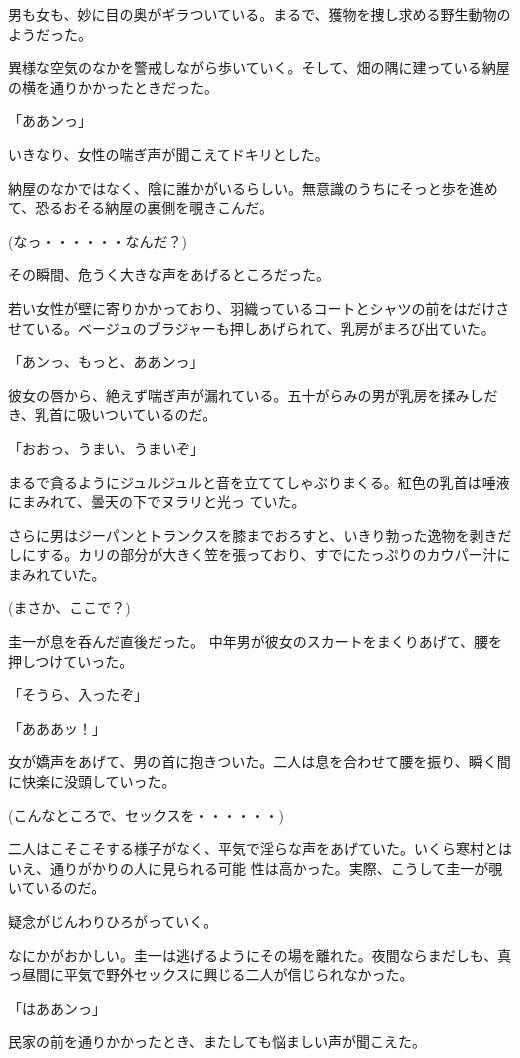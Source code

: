 ﻿\documentclass[book,tate]{jlreq}
\begin{document}
男も女も、妙に目の奥がギラついている。まるで、獲物を捜し求める野生動物のようだった。

異様な空気のなかを警戒しながら歩いていく。そして、畑の隅に建っている納屋の横を通りかかったときだった。

「ああンっ」

いきなり、女性の喘ぎ声が聞こえてドキリとした。

納屋のなかではなく、陰に誰かがいるらしい。無意識のうちにそっと歩を進めて、恐るおそる納屋の裏側を覗きこんだ。

(なっ・・・・・・なんだ？)

その瞬間、危うく大きな声をあげるところだった。

若い女性が壁に寄りかかっており、羽織っているコートとシャツの前をはだけさせている。ベージュのブラジャーも押しあげられて、乳房がまろび出ていた。

「あンっ、もっと、ああンっ」

彼女の唇から、絶えず喘ぎ声が漏れている。五十がらみの男が乳房を揉みしだき、乳首に吸いついているのだ。

「おおっ、うまい、うまいぞ」

まるで貪るようにジュルジュルと音を立ててしゃぶりまくる。紅色の乳首は唾液にまみれて、曇天の下でヌラリと光っ ていた。

さらに男はジーパンとトランクスを膝までおろすと、いきり勃った逸物を剥きだしにする。カリの部分が大きく笠を張っており、すでにたっぷりのカウパー汁にまみれていた。

(まさか、ここで？)

圭一が息を呑んだ直後だった。 中年男が彼女のスカートをまくりあげて、腰を押しつけていった。

「そうら、入ったぞ」

「あああッ！」

女が嬌声をあげて、男の首に抱きついた。二人は息を合わせて腰を振り、瞬く間に快楽に没頭していった。

(こんなところで、セックスを・・・・・・)

二人はこそこそする様子がなく、平気で淫らな声をあげていた。いくら寒村とはいえ、通りがかりの人に見られる可能 性は高かった。実際、こうして圭一が覗いているのだ。

疑念がじんわりひろがっていく。

なにかがおかしい。圭一は逃げるようにその場を離れた。夜間ならまだしも、真っ昼間に平気で野外セックスに興じる二人が信じられなかった。

「はああンっ」

民家の前を通りかかったとき、またしても悩ましい声が聞こえた。
\end{document}

